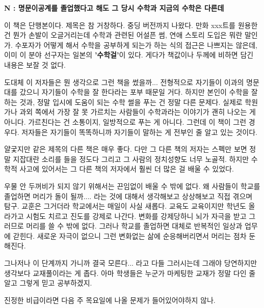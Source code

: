 \textbf{N : 명문이공계를 졸업했다고 해도 그 당시 수학과 지금의 수학은 다른데}
\vspace{5mm}

이 책은 단행본이다. 제목은 참 거창하다. 중딩 버전까지 나왔다.
만화 xxx트를 원용한 건 뭔가 손발이 오글거리는데 수학과 관련된 어설픈 썸, 연애 스토리 도입은 뭐란 말인가.
수포자가 어떻게 해서 수학을 공부하게 되는가 하는 식의 접근은 나쁘지는 않은데, 이미 이 분야 선구자는 일본의 \textbf{'수학걸'}이 있다.
게다가 책값이나 두께에 비하면 담긴 내용은 보잘 것 없다.
\vspace{5mm}

도대체 이 저자들은 뭔 생각으로 그런 책을 썼을까...
전형적으로 자기들이 이과의 명문대를 갔으니 자기들이 수학을 잘 한다라는 포부 때문일 거다.
하지만 본인이 수학을 잘 하는 것과, 정말 입시에 도움이 되는 수학 썰을 푸는 건 정말 다른 문제다.
실제로 학원가나 과외 쪽에서 가장 잘 못 가르치는 사람들이 수학과라는 이야기가 괜히 나오는 게 아니다.
가르친다는 건 소통이지, 일방적으로 푸는 게 아니다.
그런데 이 책이 그런 경우다. 저자들은 자기들이 똑똑하니까 자기들이 말하는 게 전부인 줄 알고 있는 것이다.
\vspace{5mm}

얄궃지만 같은 제목의 다른 책은 매우 좋다. 다만 그 다른 책의 저자는 스펙만 보면 정말 지잡대란 소리를 들을 정도다
그리고 그 사람의 정치성향도 너무 노골적.
하지만 수학적 사고에 있어서는 그 다른 책의 저자에서 훨씬 더 많은 걸 배울 수 있었다.
\vspace{5mm}

우물 안 두꺼비가 되지 않기 위해서는 끈임없이 배울 수 밖에 없다.
왜 사람들이 학교를 졸업하면 머리가 돌이 될까.... 라는 것에 대해서 생각해보고 상상해보고 직접 겪으며 탐구.
교훈은 그거더라
학교에서는 매일이 사실 새롭다. 교육도 교육이지만 학년도 올라가고 시험도 치르고 진도를 강제로 나간다.
변화를 강제당하니 뇌가 자극을 받고 그러므로 머리를 쓸 수 밖에 없다.
그러나 학교를 졸업하면 대체로 반복적인 일상과 업무에 갇힌다.
새로운 자극이 없으니 그런 변화없는 삶에 순응해버리면서 머리는 점차 둔해진다.
\vspace{5mm}

그나저나 이 단계까지 가니까 결국 모른다... 라고 다들 그러시는데 그래야 당연하지만
생각보다 교재풀이라는 게 좁다.
아마 학생들은 누군가 마케팅한 교재가 정말 다인 줄 알고 그렇게 믿고 공부하겠지.
\vspace{5mm}

진정한 비급이라면 다음 주 목요일에 나올 문제가 들어있어야하지 않나.
\vspace{5mm}





